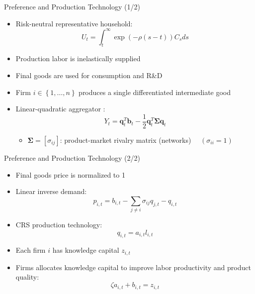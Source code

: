 \documentclass[
  10pt,
  aspectratio=169,   %
]{beamer}
\theoremstyle{plain}
\begin{document}
\begin{frame}{Preference and Production Technology (1/2)}
  \begin{itemize}
    \item Risk-neutral representative household:
          \[
            U_t = \int_{t}^{\infty}\exp\left(-\rho (s - t)\right)C_{s}ds
          \]
          \pause
    \item Production labor is inelastically supplied
          \medskip{}\pause
    \item Final goods are used for consumption and R\&D
          \medskip{}\pause
    \item Firm $i\in \left\{1,\ldots,n\right\}$ produces a single differentiated intermediate good
          \medskip{}\pause
    \item Linear-quadratic aggregator \citep{Pellegrino2024-dn}:
          \[
            Y_{t}=\bm{q}_{t}^{T}\bm{b}_{t}-\frac{1}{2}\bm{q}_{t}^{T}\bm{\Sigma}\bm{q}_{t}
          \]\vspace{-1.5em}
          \begin{itemize}
            \item \alert{$\bm{\Sigma}=\left[\sigma_{ij}\right]$: product-market rivalry matrix (networks) $\quad (\sigma_{ii} = 1)$}
          \end{itemize}
  \end{itemize}
\end{frame}

\begin{frame}{Preference and Production Technology (2/2)}
  \begin{itemize}
    \item Final goods price is normalized to 1\medskip{} \pause
    \item Linear inverse demand: \[p_{i,t}=b_{i,t}-\sum_{j\neq i}\sigma_{ij}q_{j,t} - q_{i,t}\] \pause
    \item CRS production technology: \[q_{i,t}=a_{i,t}l_{i,t}\] \pause
    \item Each firm $i$ has knowledge capital $z_{i,t}$
          \medskip{} \pause
    \item Firms allocates knowledge capital to improve labor productivity and product quality:
          \[
            \zeta a_{i,t}+b_{i,t}=z_{i,t}
          \]
  \end{itemize}
\end{frame}
\end{document}

